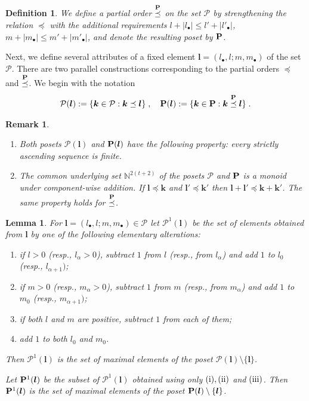 \documentclass[12pt]{article}
\def\NN {{\mathbb N}}     %
\def\mc {\mathcal}
\newtheorem{lemma}[theorem]{Lemma}
\newtheorem{rem}{Remark}[section]
\newtheorem{definition}{Definition}[section]
\begin{document}
\begin{definition}\label{Def Poset IP}
We define a partial order $\stackrel{\bf P}{\preceq}$ on the set $\mc P$ by strengthening the relation $\preceq$ with the additional requirements $l+|l_\bullet| \leq l'+|l'_\bullet|$, $m+|m_\bullet|\leq m'+|m'_\bullet|$, and denote the resulting poset by ${\bf P}$.
\end{definition}


Next, we define several attributes of a fixed element $\bm l=(l_\bullet,l;m,m_\bullet)$ of the set $\mc P$. There are two parallel constructions corresponding to the partial orders $\preceq$ and $\stackrel{\bf P}{\preceq}$. We begin with the notation
\begin{gather*}
\mc P(\bm l):= \{\bm k\in\mc P: \bm k\preceq \bm l\} \;,\quad 
{\bf P}(\bm l):= \{\bm k\in{\bf P}: \bm k\stackrel{\bf P}{\preceq} \bm l\}\;.
\end{gather*}

\begin{rem}\label{Rem mcPl has finite assend chains}
\begin{enumerate}
\item Both posets $\mc P(\bm l)$ and ${\bf P}(\bm l)$ have the following property: every strictly ascending sequence is finite.
\item The common underlying set $\NN^{2(t+2)}$ of the posets $\mc P$ and ${\bf P}$ is a monoid under component-wise addition. If $\bm l\preceq \bm k$ and $\bm l'\preceq\bm k'$ then $\bm l+\bm l'\preceq\bm k+\bm k'$. The same property holds for $\stackrel{\bf P}{\preceq}$.
\end{enumerate}
\end{rem}

\begin{lemma}\label{Lemma P1 and IP1}
For $\bm l= (l_\bullet,l;m,m_\bullet)\in\mc P$ let $\mc P^1(\bm l)$ be the set of elements obtained from $\bm l$ by one of the following elementary alterations:
\begin{enumerate}
\item[{\rm (i)}] if $l>0$ (resp., $l_\alpha>0$), subtract $1$ from $l$ (resp., from $l_\alpha$) and add $1$ to $l_0$ (resp., $l_{\alpha+1})$;
\item[{\rm (ii)}] if $m>0$ (resp., $m_\alpha>0$), subtract $1$ from $m$ (resp., from $m_\alpha$) and add $1$ to $m_0$ (resp., $m_{\alpha+1})$;
\item[{\rm (iii)}] if both $l$ and $m$ are positive, subtract $1$ from each of them; 
\item[{\rm (iv)}] add $1$ to both $l_0$ and $m_0$.
\end{enumerate}
Then $\mc P^1(\bm l)$ is the set of maximal elements of the poset $\mc P(\bm l)\setminus\{\bm l\}$.

Let ${\bf P}^1(\bm l)$ be the subset of $\mc P^1(\bm l)$ obtained using only ${\rm(i)},{\rm(ii)}$ and ${\rm(iii)}$. Then ${\bf P}^1(\bm l)$ is the set of maximal elements of the poset ${\bf P}(\bm l)\setminus\{\bm l\}$.
\end{lemma}
\end{document}
